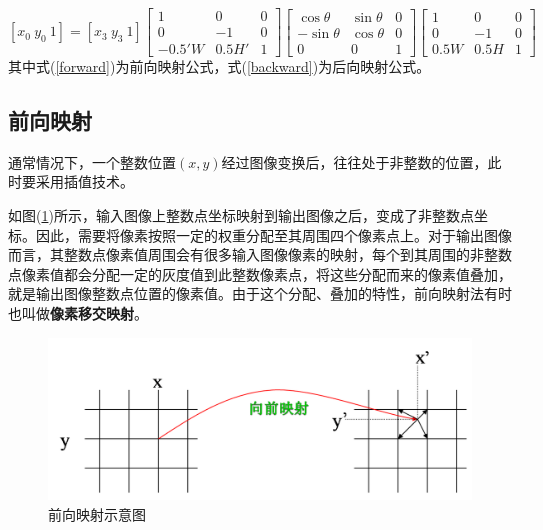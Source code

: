 \documentclass[UTF-8, a4paper, 12pt]{ctexart}
\begin{document}
\begin{equation}\label{backward}
    \left[x_0\ y_0\  1\right]=\left[x_3\ y_3\ 1\right]
    \left[\begin{array}{ccc}
        1&0&0\\
        0&-1&0\\
        -0.5'W&0.5H'&1
    \end{array}\right]\left[\begin{array}{ccc}
        \cos\theta &\sin\theta&0\\
        -\sin\theta&\cos\theta&0\\
        0&0&1
    \end{array}\right]\left[\begin{array}{ccc}
        1&0&0\\
        0&-1&0\\
        0.5W&0.5H&1
    \end{array}\right]
\end{equation}
其中式(\ref{forward})为前向映射公式，式(\ref{backward})为后向映射公式。

\subsection{前向映射}
通常情况下，一个整数位置$(x,y)$经过图像变换后，往往处于非整数的位置，此时要采用插值技术。

如图(\ref{f1})所示，输入图像上整数点坐标映射到输出图像之后，变成了非整数点坐标。因此，需要将像素按照一定的权重分配至其周围四个像素点上。对于输出图像而言，其整数点像素值周围会有很多输入图像像素的映射，每个到其周围的非整数点像素值都会分配一定的灰度值到此整数像素点，将这些分配而来的像素值叠加，就是输出图像整数点位置的像素值。由于这个分配、叠加的特性，前向映射法有时也叫做{\bfseries 像素移交映射}。

\begin{figure}[htbp]
    \centering
    \includegraphics[width=13cm]{fig/f1.jpg}
    \caption{前向映射示意图}
    \label{f1}
\end{figure}
\end{document}
